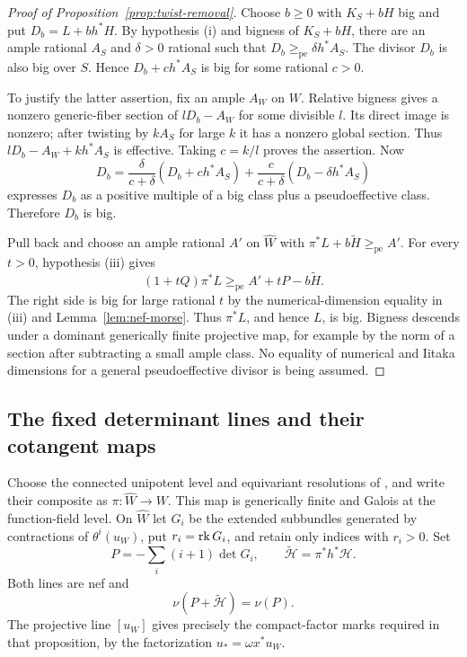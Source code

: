 \begin{proof}[Proof of Proposition~\ref{prop:twist-removal}]
Choose $b\geq0$ with $K_S+bH$ big and put $D_b=L+b h^*H$.
By hypothesis \textup{(i)} and bigness of $K_S+bH$, there are an ample rational $A_S$ and
$\delta>0$ rational such that $D_b\ge_{\mathrm{pe}}\delta h^*A_S$.
The divisor $D_b$ is also big over $S$. Hence
$D_b+c h^*A_S$ is big for some rational $c>0$.

To justify the latter assertion, fix an ample $A_W$ on $W$.
Relative bigness gives a nonzero generic-fiber section of
$lD_b-A_W$ for some divisible $l$. Its direct image is nonzero;
after twisting by $kA_S$ for large $k$ it has a nonzero global
section. Thus $lD_b-A_W+k h^*A_S$ is effective. Taking $c=k/l$
proves the assertion. Now
\[
 D_b=\frac{\delta}{c+\delta}(D_b+c h^*A_S)
      +\frac{c}{c+\delta}(D_b-\delta h^*A_S)
\]
expresses $D_b$ as a positive multiple of a big class plus a
pseudoeffective class. Therefore $D_b$ is big.

Pull back and choose an ample rational $A'$ on $\widehat W$ with
$\pi^*L+b\widetilde H\ge_{\mathrm{pe}} A'$. For every $t>0$,
hypothesis \textup{(iii)} gives
\[
 (1+tQ)\pi^*L\ge_{\mathrm{pe}} A'+tP-b\widetilde H.
\]
The right side is big for large rational $t$ by
the numerical-dimension equality in \textup{(iii)} and
Lemma~\ref{lem:nef-morse}. Thus
$\pi^*L$, and hence $L$, is big. Bigness descends under a dominant
generically finite projective map, for example by the norm of a
section after subtracting a small ample class. No equality of
numerical and Iitaka dimensions for a general pseudoeffective
divisor is being assumed.

\end{proof}

\subsection{The fixed determinant lines and their cotangent maps}

Choose the connected unipotent level and equivariant resolutions of
, and write their composite as
$\pi:\widehat W\to W$.  This map is generically finite and Galois at the
function-field level.  On $\widehat W$ let $G_i$ be the extended subbundles
generated by contractions of $\theta^i(u_W)$, put $r_i=\operatorname{rk} G_i$, and retain
only indices with $r_i>0$.  Set
\begin{equation}\label{eq:nonvanishing-tail}
 P=-\sum_i(i+1)\det G_i,\qquad
 \widetilde{\mathcal H}=\pi^*h^*\mathcal H.
\end{equation}
Both lines are nef and
\begin{equation}\label{eq:nonvanishing-rank}
             \nu(P+\widetilde{\mathcal H})=\nu(P).
\end{equation}
The projective line $[u_W]$ gives precisely the compact-factor marks
required in that proposition, by the factorization
$u_*=\omega x^*u_W$.

